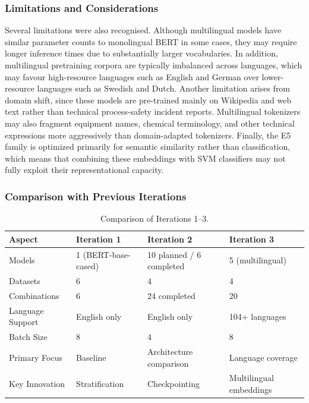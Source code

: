 \documentclass[11pt, titlepage, bibliography=totoc]{scrreprt}
\begin{document}
\subsubsection{Limitations and Considerations}
Several limitations were also recognised. Although multilingual models have similar parameter counts to monolingual BERT in some cases, they may require longer inference times due to substantially larger vocabularies. In addition, multilingual pretraining corpora are typically imbalanced across languages, which may favour high-resource languages such as English and German over lower-resource languages such as Swedish and Dutch. Another limitation arises from domain shift, since these models are pre-trained mainly on Wikipedia and web text rather than technical process-safety incident reports. Multilingual tokenizers may also fragment equipment names, chemical terminology, and other technical expressions more aggressively than domain-adapted tokenizers. Finally, the E5 family is optimized primarily for semantic similarity rather than classification, which means that combining these embeddings with SVM classifiers may not fully exploit their representational capacity.

\subsubsection{Comparison with Previous Iterations}

\begin{table}[htbp]
\centering
\small
\begin{tabular}{@{}llll@{}}
\toprule
\textbf{Aspect} & \textbf{Iteration 1} & \textbf{Iteration 2} & \textbf{Iteration 3} \\
\midrule
Models & 1 (BERT-base-cased) & 10 planned / 6 completed & 5 (multilingual) \\
Datasets & 6 & 4 & 4 \\
Combinations & 6 & 24 completed & 20 \\
Language Support & English only & English only & 104+ languages \\
Batch Size & 8 & 4 & 8 \\
Primary Focus & Baseline & Architecture comparison & Language coverage \\
Key Innovation & Stratification & Checkpointing & Multilingual embeddings \\
\bottomrule
\end{tabular}
\caption{Comparison of Iterations 1--3.}
\label{tab:iteration_comparison}
\end{table}
\end{document}
